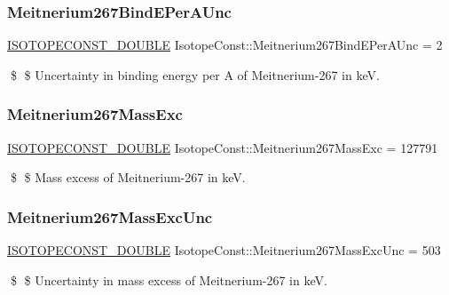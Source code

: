 \subsubsection{\texorpdfstring{Meitnerium267\+Bind\+E\+Per\+A\+Unc}{Meitnerium267BindEPerAUnc}}
{\footnotesize\ttfamily \mbox{\hyperlink{group___isotope_const-_macros_ga8f45a7272ce02c0b4c65c44636ed719a}{I\+S\+O\+T\+O\+P\+E\+C\+O\+N\+S\+T\+\_\+\+D\+O\+U\+B\+LE}} Isotope\+Const\+::\+Meitnerium267\+Bind\+E\+Per\+A\+Unc = 2}

\$ \$ Uncertainty in binding energy per A of Meitnerium-\/267 in keV. \mbox{\label{group___isotope_const-_meitnerium-_mt267_ga7033017b90d7a3af9e2ffb63d861722e}} 
\subsubsection{\texorpdfstring{Meitnerium267\+Mass\+Exc}{Meitnerium267MassExc}}
{\footnotesize\ttfamily \mbox{\hyperlink{group___isotope_const-_macros_ga8f45a7272ce02c0b4c65c44636ed719a}{I\+S\+O\+T\+O\+P\+E\+C\+O\+N\+S\+T\+\_\+\+D\+O\+U\+B\+LE}} Isotope\+Const\+::\+Meitnerium267\+Mass\+Exc = 127791}

\$ \$ Mass excess of Meitnerium-\/267 in keV. \mbox{\label{group___isotope_const-_meitnerium-_mt267_gafb122585042687f36baea123ec2ebe0b}} 
\subsubsection{\texorpdfstring{Meitnerium267\+Mass\+Exc\+Unc}{Meitnerium267MassExcUnc}}
{\footnotesize\ttfamily \mbox{\hyperlink{group___isotope_const-_macros_ga8f45a7272ce02c0b4c65c44636ed719a}{I\+S\+O\+T\+O\+P\+E\+C\+O\+N\+S\+T\+\_\+\+D\+O\+U\+B\+LE}} Isotope\+Const\+::\+Meitnerium267\+Mass\+Exc\+Unc = 503}

\$ \$ Uncertainty in mass excess of Meitnerium-\/267 in keV. \mbox{\label{group___isotope_const-_meitnerium-_mt267_gaa66a606b2b83abe99190bacbcd1b7d83}} 
